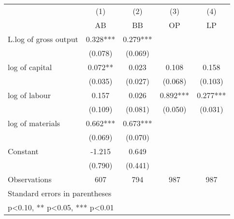 {
\def\sym#1{\ifmmode^{#1}\else\(^{#1}\)\fi}
\begin{tabular}{l*{4}{c}}
\hline\hline
                    &\multicolumn{1}{c}{(1)}&\multicolumn{1}{c}{(2)}&\multicolumn{1}{c}{(3)}&\multicolumn{1}{c}{(4)}\\
                    &\multicolumn{1}{c}{AB}&\multicolumn{1}{c}{BB}&\multicolumn{1}{c}{OP}&\multicolumn{1}{c}{LP}\\
\hline
L.log of gross output&       0.328***&       0.279***&               &               \\
                    &     (0.078)   &     (0.069)   &               &               \\
[1em]
log of capital      &       0.072** &       0.023   &       0.108   &       0.158   \\
                    &     (0.035)   &     (0.027)   &     (0.068)   &     (0.103)   \\
[1em]
log of labour       &       0.157   &       0.026   &       0.892***&       0.277***\\
                    &     (0.109)   &     (0.081)   &     (0.050)   &     (0.031)   \\
[1em]
log of materials    &       0.662***&       0.673***&               &               \\
                    &     (0.069)   &     (0.070)   &               &               \\
[1em]
Constant            &      -1.215   &       0.649   &               &               \\
                    &     (0.790)   &     (0.441)   &               &               \\
\hline
Observations        &         607   &         794   &         987   &         987   \\
\hline\hline
\multicolumn{5}{l}{\footnotesize Standard errors in parentheses}\\
\multicolumn{5}{l}{\footnotesize * p<0.10, ** p<0.05, *** p<0.01}\\
\end{tabular}
}

